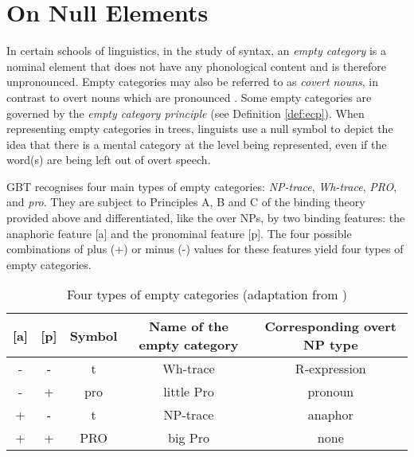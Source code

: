 \section{On Null Elements}
\label{sec:null-elements-gbt}
In certain schools of linguistics, in the study of syntax, an \textit{empty category} is a nominal element that does not have any phonological content and is therefore unpronounced. Empty categories may also be referred to as \textit{covert nouns}, in contrast to overt nouns which are pronounced \citep{Chomsky1993lectures}. Some empty categories are governed by the \textit{empty category principle} (see Definition \ref{def:ecp}). When representing empty categories in trees, linguists use a null symbol to depict the idea that there is a mental category at the level being represented, even if the word(s) are being left out of overt speech. 

GBT recognises four main types of empty categories: \textit{NP-trace}, \textit{Wh-trace}, \textit{PRO}, and \textit{pro}. They are subject to Principles A, B and C of the binding theory provided above and differentiated, like the over NPs, by two binding features: the anaphoric feature [a] and the pronominal feature [p]. The four possible combinations of plus (+) or minus (-) values for these features yield four types of empty categories. 

\begin{table}[!ht]
	\centering
		\begin{tabulary}{\linewidth}{|c|c|c|C|C|}
			\hline
			\textbf{{[}a{]}} & \textbf{{[}p{]}} & \textbf{Symbol} & \textbf{Name of the empty category} & \textbf{Corresponding overt NP type} \\ \hline
			-                & -                & t               & Wh-trace                        & R-expression                           \\ \hline
			-                & +                & pro             & little Pro                      & pronoun                                \\ \hline
			+                & -                & t               & NP-trace                        & anaphor                                \\ \hline
			+                & +                & PRO             & big Pro                         & none                                   \\ \hline
		\end{tabulary}%
	\caption{Four types of empty categories 
(adaptation from \citep[436]{Haegeman1991})}
	\label{tab:null-types}
\end{table}

